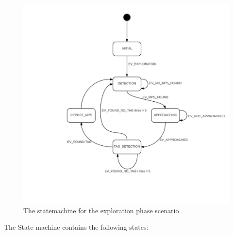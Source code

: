 \begin{figure}
\centering
\includegraphics[scale=0.25]{pic/robotino_state_machine.png}
\caption{The statemachine for the exploration phase scenario}
\label{fig:statemachine}
\end{figure}

\newpage


The State machine contains the following states:

